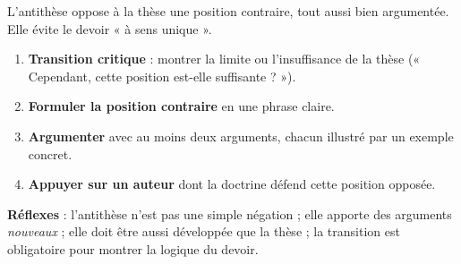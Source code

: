 \documentclass[11pt]{article}
\newcommand{\cle}[1]{{\popxbold\color{popdark}#1}}
\begin{document}
\begin{methode}
L'\cle{antithèse} oppose à la thèse une position contraire, tout aussi bien argumentée. Elle évite le devoir « à sens unique ».
\begin{enumerate}
\item \textbf{Transition critique} : montrer la limite ou l'insuffisance de la thèse (« Cependant, cette position est-elle suffisante ? »).
\item \textbf{Formuler la position contraire} en une phrase claire.
\item \textbf{Argumenter} avec au moins deux arguments, chacun illustré par un exemple concret.
\item \textbf{Appuyer sur un auteur} dont la doctrine défend cette position opposée.
\end{enumerate}
\textbf{Réflexes} : l'antithèse n'est pas une simple négation ; elle apporte des arguments \emph{nouveaux} ; elle doit être aussi développée que la thèse ; la transition est obligatoire pour montrer la logique du devoir.
\end{methode}
\end{document}
